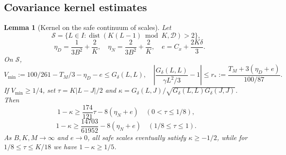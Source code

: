 \documentclass[a4paper,11pt]{article}
\newtheorem{lemma}{Lemma}[section]
\theoremstyle{remark}
\begin{document}
\subsection{Covariance kernel estimates}
\begin{lemma}[Kernel on the safe continuum of scales]\label{lem:paperkernel}
Let
\[
 \mathcal S=\{L\in I:\operatorname{dist}(K(L-1)\bmod K,\mathcal D)>2\},
\]
\[
 \quad\eta_D=\frac1{3B^2}+\frac2K,\quad\eta_N=\frac2{3B^2}+\frac2K,
 \quad e=C_x+\frac{2K\delta}{3}.
\]
On $\mathcal S$,
\[
 V_{\min}:=100/261-T_M/3-\eta_D-e\le G_\delta(L,L),
 \quad\left|\frac{G_\delta(L,L)}{\gamma L^2/3}-1\right|
 \le r_*:=\frac{T_M+3(\eta_D+e)}{100/87}.
\]
If $V_{\min}\ge1/4$, set $\tau=K|L-J|/2$ and
$\kappa=G_\delta(L,J)/\sqrt{G_\delta(L,L)G_\delta(J,J)}$. Then
\[
 1-\kappa\ge\frac{174}{121}\tau-8(\eta_N+e)\quad(0<\tau\le1/8),
\]
\[
 1-\kappa\ge\frac{14703}{61952}-8(\eta_N+e)\quad(1/8\le\tau\le1).
\]
As $B,K,M\to\infty$ and $e\to0$, all safe scales eventually satisfy
$\kappa\ge-1/2$, while for $1/8\le\tau\le K/18$ we have $1-\kappa\ge1/5$.
\end{lemma}
\end{document}
